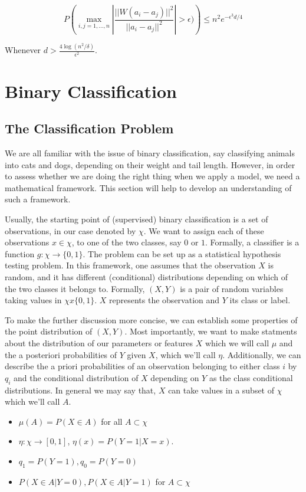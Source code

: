 \documentclass[12pt, authoryear]{elsarticle}
\begin{document}
$$P\left( \max_{i,j=1,...,n} \left| \frac{||W(a_i-a_j)||^2}{||a_i-a_j||^2}\right| > \epsilon )\right) \leq n^2 e^{-\epsilon^3 d/4}$$

Whenever $d > \frac{4 \log(n^2/\delta)}{\epsilon^2}$. 

\section{Binary Classification}
\subsection{The Classification Problem}

We are all familiar with the issue of binary classification, say classifying animals into cats and dogs, depending on their weight and tail length. However, in order to assess whether we are doing the right thing when we apply a model, we need a mathematical framework. This section will help to develop an understanding of such a framework. 

Usually, the starting point of (supervised) binary classification is a set of observations, in our case denoted by $\chi$. We want to assign each of these observations $x \in \chi$, to one of the two classes, say $0$ or $1$. Formally, a classifier is a function $g: \chi \rightarrow \{0,1\}$. The problem can be set up as a statistical hypothesis testing problem. In this framework, one assumes that the observation $X$ is random, and it has different (conditional) distributions depending on which of the two classes it belongs to. Formally, $(X,Y)$ is a pair of random variables taking values in $ \chi x \{0,1\}$. $X$ represents the observation and $Y$ its class or label. 

To make the further discussion more concise, we can establish some properties of the point distribution of $(X,Y)$. Most importantly, we want to make statments about the distribution of our parameters or features $X$ which we will call $\mu$ and the a posteriori probabilities of $Y$ given $X$, which we'll call $\eta$. Additionally, we can describe the a priori probabilities of an observation belonging to either class $i$ by $q_i$ and the conditional distribution of $X$ depending on $Y$ as the class conditional distributions. In general we may say that, $X$ can take values in a subset of $\chi$ which we'll call $A$.

\begin{itemize}
\item $\mu (A) = P(X \in A)$ for all $A \subset \chi$
\item $\eta: \chi \rightarrow [0,1]$, $\eta(x) = P(Y=1 | X=x)$.
\item $q_1 = P(Y=1), q_0 = P(Y=0)$
\item $P(X \in A | Y= 0) ,  P(X \in A | Y = 1)$ for $A \subset \chi$
\end{itemize}
\end{document}
